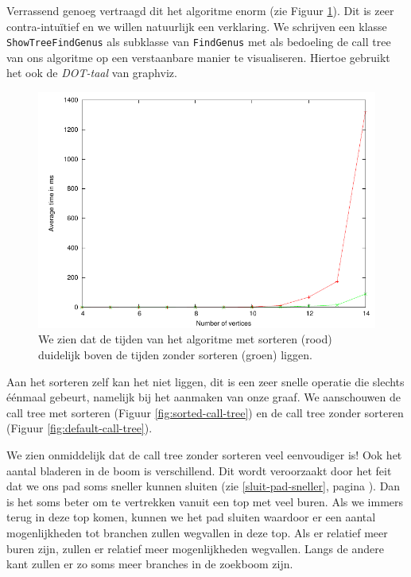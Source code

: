 \documentclass{article}
\begin{document}
Verrassend genoeg vertraagd dit het algoritme enorm (zie Figuur 
\ref{fig:bounded-vs-sorted}). Dit is zeer
contra-intu\"itief en we willen natuurlijk een verklaring. We schrijven een
klasse \verb#ShowTreeFindGenus# als subklasse van \verb#FindGenus# met als
bedoeling de call tree van ons algoritme op een verstaanbare manier te
visualiseren. Hiertoe gebruikt het ook de \emph{DOT-taal} van graphviz.
\newline

\begin{figure}
\begin{center}
\includegraphics[width=\textwidth]{images/bounded-vs-sorted.pdf}
\caption{We zien dat de tijden van het algoritme met sorteren (rood) duidelijk
boven de tijden zonder sorteren (groen) liggen.}
\label{fig:bounded-vs-sorted}
\end{center}
\end{figure}

Aan het sorteren zelf kan het niet liggen, dit is een zeer snelle operatie
die slechts \'e\'enmaal gebeurt, namelijk bij het aanmaken van onze graaf.
We aanschouwen de call tree met sorteren (Figuur \ref{fig:sorted-call-tree})
en de call tree zonder sorteren (Figuur \ref{fig:default-call-tree}).
\newline

We zien onmiddelijk dat de call tree zonder sorteren veel eenvoudiger is!
Ook het aantal bladeren in de boom is verschillend. Dit wordt veroorzaakt
door het feit dat we ons pad soms sneller kunnen sluiten (zie
\ref{sluit-pad-sneller}, pagina \pageref{sluit-pad-sneller}). Dan is het
soms beter om te vertrekken vanuit een top met veel buren. Als we immers
terug in deze top komen, kunnen we het pad sluiten waardoor er een aantal
mogenlijkheden tot branchen zullen wegvallen in deze top. Als er relatief
meer buren zijn, zullen er relatief meer mogenlijkheden wegvallen. Langs de
andere kant zullen er zo soms meer branches in de zoekboom zijn.
\newline
\end{document}
